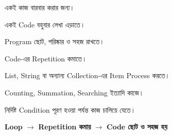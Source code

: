 \begin{compacttwocolpoints}

\item একই কাজ বারবার করার জন্য।

\item একই Code বহুবার লেখা এড়াতে।

\item Program ছোট, পরিষ্কার ও সহজ রাখতে।

\item Code-এর Repetition কমাতে।

\item List, String বা অন্যান্য Collection-এর Item Process করতে।

\item Counting, Summation, Searching ইত্যাদি কাজে।

\item নির্দিষ্ট Condition পূরণ হওয়া পর্যন্ত কাজ চালিয়ে যেতে।

\end{compacttwocolpoints}

\begin{rememberbox}

\begin{center}

\textbf{Loop}
\(\longrightarrow\)
\textbf{Repetition কমায়}
\(\longrightarrow\)
\textbf{Code ছোট ও সহজ হয়}

\end{center}

\end{rememberbox}



